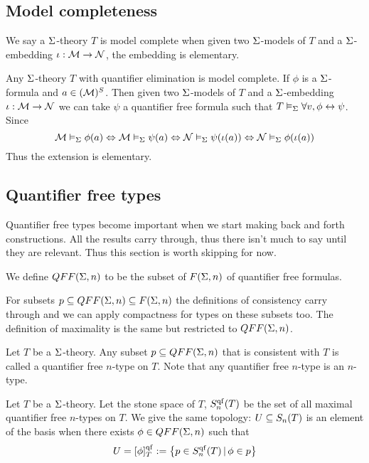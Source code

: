 \subsection{Model completeness}%
\begin{dfn}
    We say a $\Sigma$-theory $T$ is model complete when given two $\Sigma$-models
    of $T$ and a $\Sigma$-embedding $\iota : \mathcal{M} \to \mathcal{N}$,
    the embedding is elementary.
\end{dfn}
\begin{rmk}
    Any $\Sigma$-theory $T$ with quantifier elimination is model complete.
    If $\phi$ is a $\Sigma$-formula and $a \in ({\mathcal{M}})^S$.
    Then given two $\Sigma$-models
    of $T$ and a $\Sigma$-embedding $\iota : \mathcal{M} \to \mathcal{N}$ we can take
    $\psi$ a quantifier free formula such that 
    $T \vDash_{\Sigma} \forall v, \phi \leftrightarrow \psi$.
    Since 
    \[
        \mathcal{M} \vDash_{\Sigma} \phi(a) \Leftrightarrow \mathcal{M} \vDash_{\Sigma} \psi(a)
        \Leftrightarrow \mathcal{N} \vDash_{\Sigma} \psi(\iota (a)) \Leftrightarrow \mathcal{N} \vDash_{\Sigma} \phi(\iota(a))
    \]
    Thus the extension is elementary.
\end{rmk}

\subsection{Quantifier free types}
Quantifier free types become important when we start making 
back and forth constructions.
All the results carry through, 
thus there isn't much to say until they are relevant.
Thus this section is worth skipping for now.
\begin{dfn}
    We define $QFF(\Sigma,n)$ to be the subset of $F(\Sigma,n)$ 
    of quantifier free formulas.

    For subsets $p \subseteq QFF(\Sigma,n) \subseteq F(\Sigma,n)$ 
    the definitions of consistency carry through and 
    we can apply compactness for types on these subsets too.
    The definition of maximality is the same but restricted to $QFF(\Sigma,n)$.

    Let $T$ be a $\Sigma$-theory.
    Any subset $p \subseteq QFF(\Sigma,n)$ that is consistent with $T$
    is called a quantifier free $n$-type on $T$.
    Note that any quantifier free $n$-type is an $n$-type.
\end{dfn}

\begin{dfn}
    Let $T$ be a $\Sigma$-theory.
    Let the stone space of $T$, 
    $S_n^{\operatorname{qf}}(T)$ be the set of all maximal quantifier free $n$-types on $T$.
    We give the same topology:
    $U \subseteq S_n(T)$ is an element of the basis when there exists 
    $\phi \in QFF(\Sigma,n)$ such that 
    \[U = [\phi]_T^{\operatorname{qf}} := \left\{p \in S_n^{\operatorname{qf}}(T) \,|\, \phi \in p\right\}\]
\end{dfn}

